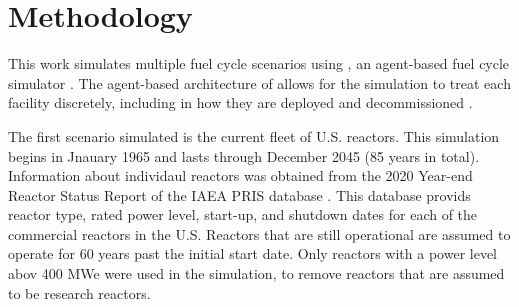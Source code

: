 \section{Methodology}

This work simulates multiple fuel cycle scenarios using \Cyclus, an 
agent-based fuel cycle simulator \cite{huff_fundamental_2016}. 
The agent-based architecture of \Cyclus allows for the simulation to treat
each facility discretely, including in how they are deployed and 
decommissioned \cite{huff_fundamental_2016}.



The first scenario simulated is the current fleet of U.S. reactors. This 
simulation begins in Jnauary 1965 and lasts through December 2045 (85 
years in total). Information about individaul reactors was obtained 
from the 2020 Year-end Reactor Status Report of the \gls{IAEA} \gls{PRIS} 
database \cite{noauthor_power_1989}. 
This database provids reactor type, rated power level, start-up, and 
shutdown dates for each of the commercial reactors in the U.S. Reactors 
that are still operational are assumed to operate for 60 years past the 
initial start date. Only reactors with a power level abov 400 MWe were 
used in the simulation, to remove reactors that are assumed to be research 
reactors. 